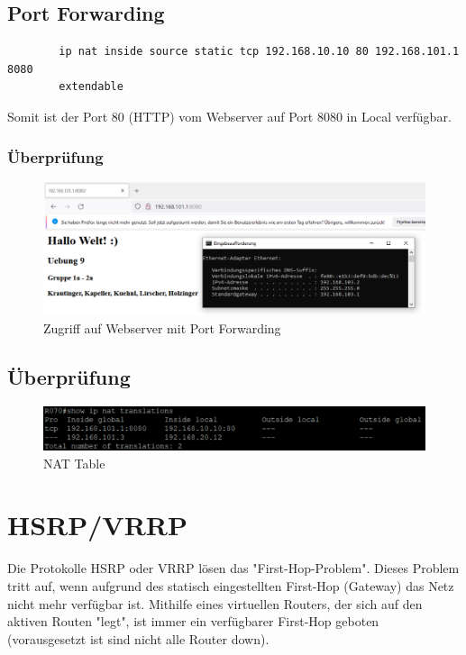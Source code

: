 \documentclass[a4paper, ngerman]{article}
\begin{document}
\subsection{Port Forwarding}
\begin{framed}
    \begin{verbatim}
        ip nat inside source static tcp 192.168.10.10 80 192.168.101.1 8080 
        extendable
    \end{verbatim}
\end{framed}

Somit ist der Port 80 (HTTP) vom Webserver auf Port 8080 in Local verfügbar.
\subsubsection{Überprüfung}
\begin{figure}[H]
    \centering
    \includegraphics[scale=0.28]{screenshots/webserver_zugriff_port_forwarding.png}
    \caption{Zugriff auf Webserver mit Port Forwarding}
\end{figure}
\subsection{Überprüfung}
\begin{figure}[H]
    \centering
    \includegraphics[scale=0.28]{screenshots/nat table.png}
    \caption{NAT Table}
\end{figure}

\section{HSRP/VRRP}
Die Protokolle HSRP oder VRRP lösen das "First-Hop-Problem". Dieses Problem tritt auf, wenn aufgrund des statisch
eingestellten First-Hop (Gateway) das Netz nicht mehr verfügbar ist. Mithilfe eines virtuellen Routers, der sich
auf den aktiven Routen "legt", ist immer ein verfügbarer First-Hop geboten (vorausgesetzt ist sind nicht alle
Router down).
\end{document}
